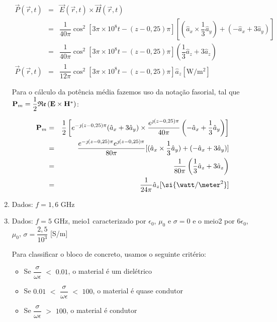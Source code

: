 \begin{enumerate}[1.]
\begin{eqnarray*}
  \vec{P}(\vec{r},t) & = & \vec{E}(\vec{r},t) \times \vec{H}(\vec{r},t) \nonumber \\
  & = & \dfrac{1}{40\pi}\cos^{2}[3\pi \times 10^{8}t - (z - 0,25)\pi][(\hat{a}_{x} \times \dfrac{1}{3} \hat{a}_{y}) + (-\hat{a}_{x} + 3\hat{a}_{y})] \nonumber \\
  & = & \dfrac{1}{40\pi}\cos^{2}[3\pi \times 10^{8}t - (z - 0,25)\pi](\dfrac{1}{3}\hat{a}_{z} + 3\hat{a}_{z}) \nonumber \\
  \vec{P}(\vec{r},t) & = &  \dfrac{1}{12\pi}\cos^{2}[3\pi \times 10^{8}t - (z - 0,25)\pi] \hat{a}_{z} [\si{\watt/\meter^{2}}] \nonumber
\end{eqnarray*}

Para o cálculo da potência média fazemos uso da notação fasorial, tal que ${\bf P}_{m} = \dfrac{1}{2}\mathfrak{Re}\left({\bf E} \times {\bf H}^{*} \right)$:

\begin{eqnarray*}  
  {\bf P}_{m} & = & \dfrac{1}{2}\left[e^{-\jmath (z - 0,25)\pi}(\hat{a}_{x} + 3\hat{a}_{y}) \times \dfrac{e^{\jmath (z - 0,25)\pi}}{40\pi}\left(-\hat{a}_{x} + \dfrac{1}{3}\hat{a}_{y}\right)\right] \nonumber \\
  & = & \dfrac{e^{-\jmath (z - 0,25)\pi} e^{\jmath (z - 0,25)\pi}}{80\pi} [(\hat{a}_{x} \times \dfrac{1}{3} \hat{a}_{y}) + \left(-\hat{a}_{x} + 3\hat{a}_{y}\right)] \nonumber \\
  & = & \dfrac{1}{80\pi}\left(\dfrac{1}{3}\hat{a}_{z} + 3\hat{a}_{z}\right) \nonumber \\
  & = & \dfrac{1}{24\pi} \hat{a}_{z}[\si{\watt/\meter^{2}}] \nonumber
\end{eqnarray*}

\newpage

\item Dados: $f = 1,6$ \si{\giga\hertz}

\newpage

\item Dados: $f = 5$ \si{\giga\hertz}, meio1 caracterizado por $\epsilon_{0}$, $\mu_{0}$ e $\sigma = 0$ e o meio2 por $6 \epsilon_{0}$, $\mu_{0}$, $\sigma = \dfrac{2,5}{10^{3}}$ [\si{\siemens/\meter}]

Para classificar o bloco de concreto, usamos o seguinte critério:
\begin{itemize}
  {\setlength\itemindent{25pt}}\item Se $\dfrac{\sigma}{\omega \epsilon}$ $<$ $0.01$, o material é um dielétrico
  {\setlength\itemindent{25pt}}\item Se $0.01$ $<$ $\dfrac{\sigma}{\omega \epsilon}$ $<$ $100$, o material é quase condutor
  {\setlength\itemindent{25pt}}\item Se $\dfrac{\sigma}{\omega \epsilon}$ $>$ $100$, o material é condutor
\end{itemize}


\end{enumerate}
